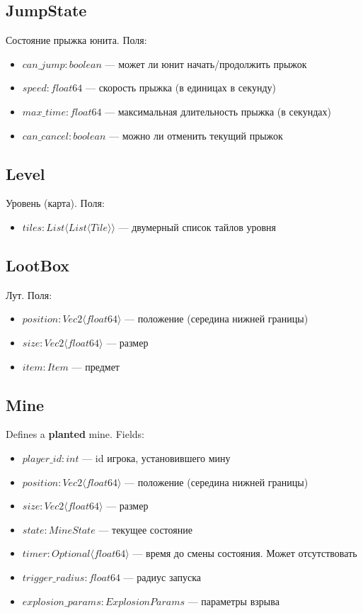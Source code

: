 \subsection{JumpState}
Состояние прыжка юнита. Поля:
\begin{itemize}
    \item $can\_jump : boolean$ --- может ли юнит начать/продолжить прыжок
    \item $speed : float64$ --- скорость прыжка (в единицах в секунду)
    \item $max\_time : float64$ --- максимальная длительность прыжка (в секундах)
    \item $can\_cancel : boolean$ --- можно ли отменить текущий прыжок
\end{itemize}

\subsection{Level}
Уровень (карта). Поля:
\begin{itemize}
    \item $tiles : List \langle List \langle Tile \rangle \rangle$ --- двумерный список тайлов уровня
\end{itemize}

\subsection{LootBox}
Лут. Поля:
\begin{itemize}
    \item $position : Vec2 \langle float64 \rangle$ --- положение (середина нижней границы)
    \item $size : Vec2 \langle float64 \rangle$ --- размер
    \item $item : Item$ --- предмет
\end{itemize}

\subsection{Mine}
Defines a \textbf{planted} mine. Fields:
\begin{itemize}
    \item $player\_id : int$ --- id игрока, установившего мину
    \item $position : Vec2 \langle float64 \rangle$ --- положение (середина нижней границы)
    \item $size : Vec2 \langle float64 \rangle$ --- размер
    \item $state : MineState$ --- текущее состояние
    \item $timer : Optional \langle float64 \rangle$ --- время до смены состояния. Может отсутствовать
    \item $trigger\_radius : float64$ --- радиус запуска
    \item $explosion\_params : ExplosionParams$ --- параметры взрыва
\end{itemize}

